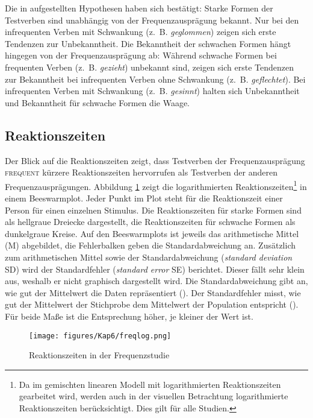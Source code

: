 Die in  aufgestellten Hypothesen haben sich bestätigt: Starke Formen der Testverben sind unabhängig von der Frequenzausprägung bekannt. Nur bei den infrequenten Verben mit Schwankung (z.~B. \textit{geglommen}) zeigen sich erste Tendenzen zur Unbekanntheit. Die Bekanntheit der schwachen Formen hängt hingegen von der Frequenzausprägung ab: Während schwache Formen bei frequenten Verben (z.~B. \textit{gezieht}) unbekannt sind, zeigen sich erste Tendenzen zur Bekanntheit bei infrequenten Verben ohne Schwankung (z.~B. \textit{geflechtet}). Bei infrequenten Verben mit Schwankung (z.~B. \textit{gesinnt}) halten sich Unbekanntheit und Bekanntheit für schwache Formen die Waage.  

\subsection{Reaktionszeiten}\label{freqrt}

Der Blick auf die Reaktionszeiten zeigt, dass Testverben der Frequenzausprägung \textsc{frequent} kürzere Reaktionszeiten hervorrufen als Testverben der anderen Frequenzausprägungen. Abbildung \ref{freqrtbee} zeigt die logarithmierten Reaktionszeiten\footnote{Da im gemischten linearen Modell mit logarithmierten Reaktionszeiten gearbeitet wird, werden auch in der visuellen Betrachtung logarithmierte Reaktionszeiten berücksichtigt. Dies gilt für alle Studien.}  in einem Beeswarmplot. Jeder Punkt im Plot steht für die Reaktionszeit einer Person für einen einzelnen Stimulus. Die Reak\-tions\-zeiten für starke Formen sind als hellgraue Dreiecke dargestellt, die Reak\-tionszeiten für schwache Formen als dunkelgraue Kreise. Auf den Beeswarmplots ist jeweils das arithmetische Mittel (M) abgebildet, die Fehlerbalken geben die Standardabweichung an. Zusätzlich zum arithmetischen Mittel  sowie der Standardabweichung (\textit{standard devia\-tion} SD) wird der Standardfehler (\textit{standard error} SE) berichtet. Dieser fällt sehr klein aus, weshalb er nicht graphisch dargestellt wird. Die Standardabweichung gibt an, wie gut der Mittelwert die Daten repräsentiert (\cite[39--40]{Field.2012}). Der Standardfehler misst, wie gut der Mittelwert der Stichprobe dem Mittelwert der Population entspricht (\cite[42--43]{Field.2012}). Für beide Maße ist die Entsprechung höher, je kleiner der Wert ist.

\begin{figure}
\texttt{[image: figures/Kap6/freqlog.png]} 
\caption{Reaktionszeiten in der Frequenzstudie}
\label{freqrtbee}
\end{figure}

